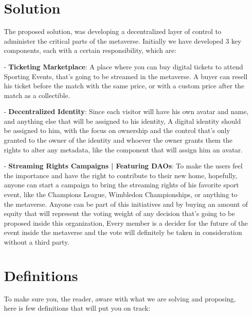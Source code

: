 \section{Solution}
The proposed solution, was developing a decentralized layer of control to administer the critical parts of the metaverse. Initially we have developed 3 key components, each with a certain responsibility, which are:
\bigskip

- \textbf{Ticketing Marketplace}:  A place where you can buy digital tickets to attend Sporting Events, that's going to be streamed in the metaverse. A buyer can resell his ticket before the match with the same price, or with a custom price after the match as a collectible.
\bigskip

- \textbf{Decentralized Identity}: Since each visitor will have his own avatar and name, and anything else that will be assigned to his identity, A digital identity should be assigned to him, with the focus on ownership and the control that's only granted to the owner of the identity and whoever the owner grants them the rights to alter any metadata, like the component that will assign him an avatar.
\bigskip

- \textbf{Streaming Rights Campaigns | Featuring DAOs}: To make the users feel the importance and have the right to contribute to their new home, hopefully, anyone can start a campaign to bring the streaming rights of his favorite sport event, like the Champions League, Wimbledon Championships, or anything to the metaverse. Anyone can be part of this initiatives and by buying an amount of equity that will represent the voting weight of any decision that's going to be proposed inside this organization, Every member is a decider for the future of the event inside the metaverse and the vote will definitely be taken in consideration without a third party. 

\section{Definitions}
To make sure you, the reader, aware with what we are solving and proposing, here is few definitions that will put you on track:

